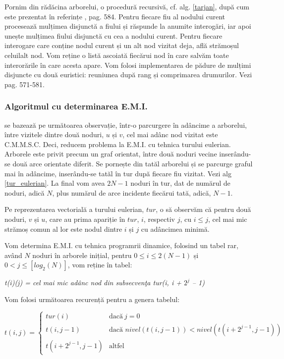 \documentclass[runningheads]{llncs}
\begin{document}
Pornim din rădăcina arborelui, o procedură recursivă, cf. alg. \ref{tarjan}, după cum este prezentat în referințe \cite{CLRS}, pag. 584. Pentru fiecare fiu al nodului curent procesează mulțimea disjunctă a fiului și răspunde la anumite interogări, iar apoi unește mulțimea fiului disjunctă cu cea a nodului curent. Pentru fiecare interogare care conține nodul curent și un alt nod vizitat deja, află strămoșul celuilalt nod. Vom reține o listă ascoiată fiecărui nod în care salvăm toate interorările în care acesta apare. Vom folosi implementarea de pădure de mulțimi disjuncte cu două euristici: reuniunea după rang și comprimarea drumurilor. Vezi \cite{CLRS} pag. 571-581.

\subsubsection{Algoritmul cu determinarea E.M.I.} se bazează pe următoarea observație, într-o parcurgere în adâncime a arborelui, între vizitele dintre două noduri, $u$ și $v$,  cel mai adânc nod vizitat este C.M.M.S.C. Deci, reducem problema la E.M.I. cu tehnica turului eulerian. Arborele este privit precum un graf orientat, între două noduri vecine inserându-se două arce orientate diferit. Se pornește din tatăl arborelui și se parcurge graful mai în adâncime, inserându-se tatăl în tur după fiecare fiu vizitat. Vezi alg \ref{tur_eulerian}. La final vom avea $2N-1$ noduri în tur, dat de numărul de noduri, adică $N$, plus numărul de arce incidente fiecărui tată, adică, $N-1$.

Pe reprezentarea vectorială a turului eulerian, $tur$, o să observăm că pentru două noduri, $v$ și $u$, care au prima apariție în $tur$, $i$, respectiv $j$, cu $i \leq j$, cel mai mic strămoș comun al lor este nodul dintre $i$ și $j$ cu adâncimea minimă.

Vom determina E.M.I. cu tehnica programrii dinamice, folosind un tabel rar, având $N$ noduri în arborele inițial, pentru $0 \leq i \leq 2(N - 1)$ și $0 < j \leq [log_2(N)]$, vom reține în tabel:

\emph{t(i)(j) = cel mai mic adânc nod din subsecvenţa tur(i, i + $2^j$ – 1)}

Vom folosi următoarea recurență pentru a genera tabelul:

$$ t(i, j) =
\left\{
	\begin{array}{ll}
	    \mbox{$tur(i)$} & \mbox{dacă} \ j = 0 \\
		\mbox{$t(i,j - 1)$} & \mbox{dacă $nivel(t(i, j - 1)) < nivel(t(i + 2^{j-1}, j - 1))$} \\
		\mbox{$t(i + 2^{j-1}, j - 1)$}  & \mbox{altfel}
	\end{array}
\right.
$$
\end{document}
